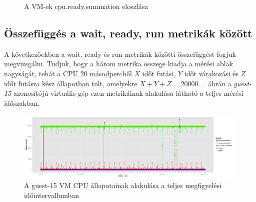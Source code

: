 \documentclass[a4paper,10pt,titlepage]{article}
\begin{document}
\begin{figure}[ht!]
  \centering
  \caption{A VM-ek cpu.ready.summation eloszlása}
  \label{fig:cpu_ready_summation_histograms}
\end{figure}

\subsection{Összefüggés a wait, ready, run metrikák között}

A következőekben a wait, ready és run metrikák közötti összefüggést fogjuk megvizsgálni. Tudjuk, hogy a három metrika összege kiadja a mérési ablak nagyságát, tehát a CPU 20 másodpercből $X$ időt futási, $Y$ időt várakozási és $Z$ időt futásra kész állapotban tölt, amelyekre $X+Y+Z=20000$. .~ábrán a \textit{guest-15} azonosítójú virtuális gép ezen metrikáinak alakulása látható a teljes mérési időszakban.

\begin{figure}[ht!]
\centering
\includegraphics[width=1.00\textwidth]{figures/cpu_run_wait_ready-guest-15-20120826230140-20120924083120.png}
\caption{ A guest-15 VM CPU állapotainak alakulása a teljes megfigyelési időintervallumban \label{fig:cpu_run_wait_ready-guest-15-01}}
\end{figure}
\end{document}
